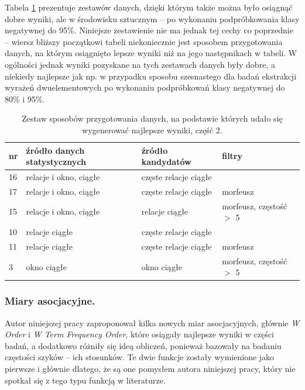 \documentclass[11pt,a4paper]{llncs}
\begin{document}
\par
Tabela \ref{ending_best_data_sets_part_2} prezentuje zestawów danych, dzięki którym także można było osiągnąć dobre wyniki, ale w środowisku sztucznym -- po wykonaniu podpróbkowania klasy negatywnej do 95\%.
Niniejsze zestawienie nie ma jednak tej cechy co poprzednie -- wiersz bliższy początkowi tabeli niekoniecznie jest sposobem przygotowania danych, na którym osiągnięto lepsze wyniki niż na jego następnikach w tabeli.
W ogólności jednak wyniki pozyskane na tych zestawach danych były dobre, a niekiedy najlepsze jak np. w przypadku sposobu szesnastego dla badań ekstrakcji wyrażeń dwuelementowych po wykonaniu podpróbkowań klasy negatywnej do 80\% i 95\%.

\begin{table}[h!]
\centering
\begin{tabular}{ l | l | l | l }
	\toprule
	\textbf{nr} 	& \textbf{źródło danych statystycznych}			& \textbf{źródło kandydatów}		& \textbf{filtry}					\\
	\midrule
	16	& relacje i okno, ciągłe				& częste relacje ciągłe	&							\\
	17	& relacje i okno, ciągłe	 			& częste relacje ciągłe	& morfeusz					\\
	15	& relacje i okno, ciągłe				& relacje ciągłe		& morfeusz, częstość $>$ 5	\\
	10	& relacje ciągłe						& częste relacje ciągłe &							\\
	11	& relacje ciągłe						& częste relacje ciągłe & morfeusz					\\
	3	& okno ciągłe 							& okno ciągłe			& morfeusz, częstość $>$ 5	\\
	\bottomrule
\end{tabular}
\caption[Zestaw sposobów przygotowania danych, na podstawie których udało się wygenerować najlepsze wyniki, część 2]{Zestaw sposobów przygotowania danych, na podstawie których udało się wygenerować najlepsze wyniki, część 2.}
\label{ending_best_data_sets_part_2}
\end{table}


\subsubsection{Miary asocjacyjne.}
Autor niniejszej pracy zaproponował kilka nowych miar asocjacyjnych, głównie \emph{W Order} i \emph{W Term Frequency Order}, które osiągały najlepsze wyniki w części badań, a dodatkowo różniły się ideą obliczeń, ponieważ bazowały na badaniu częstości szyków -- ich stosunków.
Te dwie funkcje zostały wymienione jako pierwsze i głównie dlatego, że są one pomysłem autora niniejszej pracy, który nie spotkał się z tego typu funkcją w literaturze.
\end{document}
